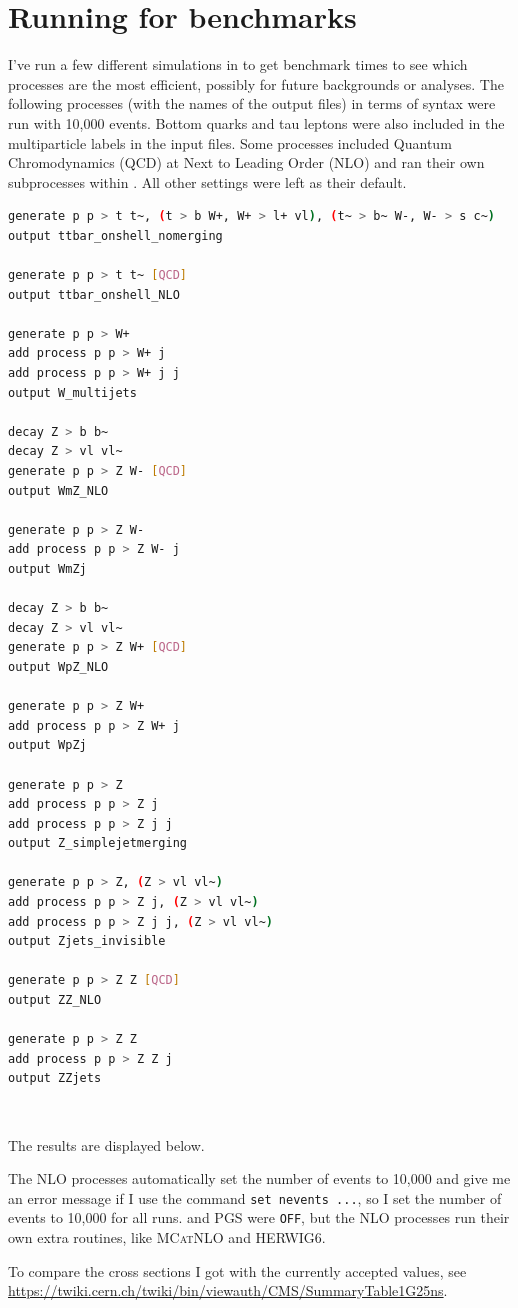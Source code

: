 \section{Running \madgraph for benchmarks}

I've run a few different simulations in \madgraph to get benchmark times to see which processes are the most efficient, possibly for future backgrounds or analyses. The following processes (with the names of the output files) in terms of \madgraph syntax were run with 10,000 events. Bottom quarks and tau leptons were also included in the multiparticle labels in the input files. Some processes included Quantum Chromodynamics (QCD) at Next to Leading Order (NLO) and ran their own subprocesses within \madgraph. All other settings were left as their default.

\begin{lstlisting}[belowskip=-0.7cm, language=sh, numbers=none]
generate p p > t t~, (t > b W+, W+ > l+ vl), (t~ > b~ W-, W- > s c~)
output ttbar_onshell_nomerging

generate p p > t t~ [QCD]
output ttbar_onshell_NLO

generate p p > W+
add process p p > W+ j
add process p p > W+ j j
output W_multijets

decay Z > b b~
decay Z > vl vl~
generate p p > Z W- [QCD]
output WmZ_NLO

generate p p > Z W-
add process p p > Z W- j
output WmZj

decay Z > b b~
decay Z > vl vl~
generate p p > Z W+ [QCD]
output WpZ_NLO

generate p p > Z W+
add process p p > Z W+ j
output WpZj

generate p p > Z
add process p p > Z j
add process p p > Z j j
output Z_simplejetmerging

generate p p > Z, (Z > vl vl~)
add process p p > Z j, (Z > vl vl~)
add process p p > Z j j, (Z > vl vl~)
output Zjets_invisible

generate p p > Z Z [QCD]
output ZZ_NLO

generate p p > Z Z
add process p p > Z Z j
output ZZjets
\end{lstlisting}

\

The results are displayed below.



The NLO processes automatically set the number of events to 10,000 and give me an error message if I use the command \texttt{set nevents ...}, so I set the number of events to 10,000 for all runs. \PYTHIA and PGS were \texttt{OFF}, but the NLO processes run their own extra routines, like \textsc{MCatNLO} and HERWIG6.

To compare the cross sections I got with the currently accepted values, see \url{https://twiki.cern.ch/twiki/bin/viewauth/CMS/SummaryTable1G25ns}.
